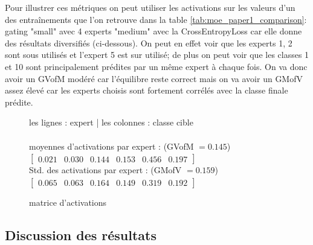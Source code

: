 \documentclass{article}
\begin{document}
Pour illustrer ces métriques on peut utiliser les activations sur les valeurs d'un des entraînements que l'on retrouve dans la table \ref{tab:moe_paper1_comparison}: gating "small" avec 4 experts "medium" avec la CrossEntropyLoss car elle donne des résultats diversifiés (ci-dessous). On peut en effet voir que les experts 1, 2 sont sous utilisés et l'expert 5 est sur utilisé; de plus on peut voir que les classes 1 et 10 sont principalement prédites par un même expert à chaque fois. On va donc avoir un GVofM modéré car l'équilibre reste correct mais on va avoir un GMofV assez élevé car les experts choisis sont fortement corrélés avec la classe finale prédite.

\begin{figure}[H] \centering
\caption{matrice d'activations} \label{fig:per_class_expert_activation}
les lignes : expert \;|\; les colonnes : classe cible \\
\\
moyennes d'activations par expert : (GVofM $= 0.145$)\\
$\begin{bmatrix} 0.021 & 0.030 & 0.144 & 0.153 & 0.456 & 0.197\end{bmatrix}$\\
Std. des activations par expert : (GMofV $= 0.159$)\\
$\begin{bmatrix} 0.065 & 0.063 & 0.164 & 0.149 & 0.319 & 0.192\end{bmatrix}$\\
\end{figure}

\subsection{Discussion des résultats}
\end{document}

